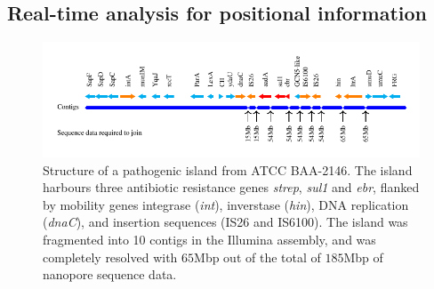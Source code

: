 \subsection{Real-time analysis for positional information}

\begin{figure}[ht]
\centering
\includegraphics[width=\linewidth]{npscarf/figures/figure3.pdf}
\caption[Structure of a pathogenic island from \kp{}
ATCC BAA-2146]
{Structure of a pathogenic island from \kp{} ATCC BAA-2146. The island harbours three antibiotic resistance genes \emph{strep}, \emph{sul1} and \emph{ebr}, flanked by mobility genes integrase (\emph{int}), inverstase (\emph{hin}), DNA replication (\emph{dnaC}), and insertion sequences (IS26 and IS6100). The island was fragmented into 10 contigs in the Illumina assembly, and was completely resolved with $65$Mbp out of the total of $185$Mbp of nanopore sequence data.}
\label{F:gi}
\end{figure}


